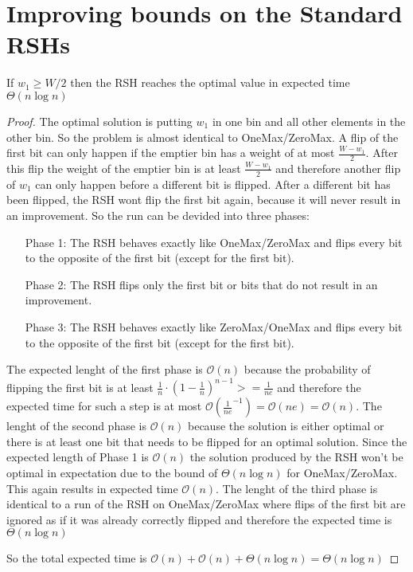 \section{Improving bounds on the Standard RSHs}
\begin{lemma}\label{OneMaxResult}
If $w_1 \ge W/2$  then the RSH reaches the optimal value in expected time $\Theta(n\log{}n)$
\end{lemma}
\begin{proof}
The optimal solution is putting $w_1$ in one bin and all other elements in the other bin. So the problem is almost identical to OneMax/ZeroMax. A flip of the first bit can only happen if the emptier bin has a weight of at most $\frac {W-w_1}{2}$. After this flip the weight of the emptier bin is at least $\frac {W-w_1}{2}$ and therefore another flip of $w_1$ can only happen before a different bit is flipped. After a different bit has been flipped, the RSH wont flip the first bit again, because it will never result in an improvement. So the run can be devided into three phases:
\begin{itemize}
    \item[Phase 1:] The RSH behaves exactly like OneMax/ZeroMax and flips every bit to the opposite of the first bit (except for the first bit).
    \item[Phase 2:] The RSH flips only the first bit or bits that do not result in an improvement.
    \item[Phase 3:] The RSH behaves exactly like ZeroMax/OneMax and flips every bit to the opposite of the first bit (except for the first bit).
\end{itemize}

The expected lenght of the first phase is $\mathcal{O}(n)$ because the probability of flipping the first bit is at least ${\frac{1}{n}} \cdot {(1 - \frac{1}{n})}^{n-1} >= \frac{1}{ne}$ and therefore the expected time for such a step is at most $\mathcal{O}(\frac{1}{ne}^{-1}) = \mathcal{O}(ne) = \mathcal{O}(n)$.\newline
The lenght of the second phase is $\mathcal{O}(n)$ because the solution is either optimal or there is at least one bit that needs to be flipped for an optimal solution. Since the expected length of Phase 1 is $\mathcal{O}(n)$ the solution produced by the RSH won't be optimal in expectation due to the bound of $\Theta(n\log{}n)$ for OneMax/ZeroMax. This again results in expected time $\mathcal{O}(n)$.\newline
The lenght of the third phase is identical to a run of the RSH on OneMax/ZeroMax where flips of the first bit are ignored as if it was already correctly flipped and therefore the expected time is $\Theta(n\log{}n)$

So the total expected time is $\mathcal{O}(n) + \mathcal{O}(n) + \Theta(n\log{}n) = \Theta(n\log{}n)$ 
\end{proof}

